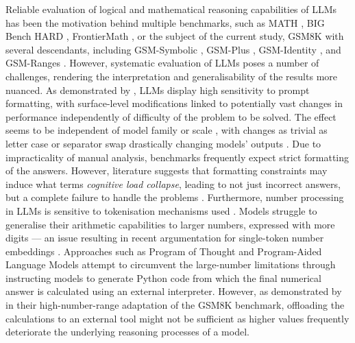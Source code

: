 \documentclass[11pt]{article}
\begin{document}
Reliable evaluation of logical and mathematical reasoning capabilities of LLMs has been the motivation behind multiple benchmarks, such as MATH \cite{hendrycks2021measuring}, BIG Bench HARD \citep{suzgun-etal-2023-challenging}, FrontierMath \citep{frontiermath2024}, or the subject of the current study, GSM8K  \citep{cobbe2021gsm8k} with several descendants, 
including GSM-Symbolic \citep{mirzadeh2025gsm}, GSM-Plus \citep{Li2024gsmplus}, GSM-Identity \citep{negi2026gsmidentity}, and GSM-Ranges \citep{shrestha2025gsmranges}. However, systematic evaluation of LLMs poses a number of challenges, rendering the interpretation and generalisability of the results more nuanced. As demonstrated by \citet{Sclar2023quantifying}, LLMs display high sensitivity to prompt formatting, with surface-level modifications linked to potentially vast changes in performance independently of difficulty of the problem to be solved. The effect seems to be independent of model family or scale \citep{Sclar2023quantifying, alhetelah2026measuring}, with changes as trivial as letter case or separator swap drastically changing models' outputs \cite{errica2025did}. Due to impracticality of manual analysis, benchmarks frequently expect strict formatting of the answers. However, literature suggests that formatting constraints may induce what \citet{cazares2026morecognitiveloadsingleprompt} terms \textit{cognitive load collapse}, leading to not just incorrect answers, but a complete failure to handle the problems \citep{cazares2026morecognitiveloadsingleprompt, mittal2026didforgetiasked}. Furthermore, number processing in LLMs is sensitive to tokenisation mechanisms used \citep{spathis2024first,singh2024tokenization}. Models struggle to generalise their arithmetic capabilities to larger numbers, expressed with more digits \citep{yang2023gpt, zhou2024what} --- an issue resulting in recent argumentation for single-token number embeddings \citep{kreitner2025efficient,zhou2025fone}. Approaches such as Program of Thought \citep{chen2023program} and Program-Aided Language Models \cite{gao2023pal} attempt to circumvent the large-number limitations through instructing models to generate Python code from which the final numerical answer is calculated using an external interpreter. However, as demonstrated by \citeauthor{shrestha2025gsmranges} in their high-number-range adaptation of the GSM8K benchmark, offloading the calculations to an external tool might not be sufficient as higher values frequently deteriorate the underlying reasoning processes of a model.

\end{document}
